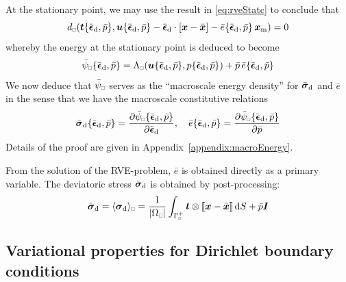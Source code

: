 \documentclass{bmcart}
\newcommand{\appref}[1]{Appendix~\ref{#1}}
\newcommand{\eqtref}[1]{\eqref{#1}}
\DeclarePairedDelimiter{\homgen}{\langle}{\rangle_\rve}
\DeclarePairedDelimiter{\jmp}{[\![}{]\!]}
\renewcommand{\dev}{\mathrm{d}}
\newcommand{\volume}{|\Omega_\rve|}
\newcommand{\epspargs}{\{{\bar{\ts\epsilon}}_\dev, \bar{p}\}}
\newcommand{\rve}{
  {\mathchoice
   {\mbox{\scalebox{0.67}{$\Box$}}}
   {\mbox{\scalebox{0.67}{$\Box$}}}
   {\mbox{\scalebox{0.5}{$\Box$}}}
   {\mbox{\scalebox{0.375}{$\Box$}}}
  }
}
\begin{document}
At the stationary point, we may use the result in \eqtref{eq:rveStatc} to conclude that
\begin{equation}
    d_\rve(\ta{t}\epspargs,\ta{u}\epspargs-\bar{\ts\epsilon}_\dev\cdot[\ta{x}-\bar{\ta{x}}]-\bar{e}\epspargs\,\ta{x}_\mean) = 0
\label{eq86}
\end{equation}
whereby the energy at the stationary point is deduced to become
\begin{equation}
    \bar{\psi}_\rve\epspargs =
    \Lambda_\rve(\ta{u}\epspargs,p\epspargs) + \bar{p}\,\bar{e}\epspargs
\label{eq87}
\end{equation}
We now deduce that $\bar{\psi}_\rve$ serves as the ``macroscale energy density'' for $\bar{\ts\sigma}_\dev$ and $\bar{e}$ in the sense that we have the macroscale constitutive relations
\begin{equation}
    \bar{\ts\sigma}_\dev\epspargs = \frac{\partial \bar{\psi}_\rve\epspargs}{\partial \bar{\ts\epsilon}_\dev}, \quad
     \bar{e}\epspargs = \frac{\partial \bar{\psi}_\rve\epspargs}{\partial \bar{p}}
\label{eq88}
\end{equation}
Details of the proof are given in \appref{appendix:macroEnergy}.

From the solution of the RVE-problem, $\bar{e}$ is obtained directly as a primary variable.
The deviatoric stress $\bar{\ts\sigma}_\dev$ is obtained by post-processing:
\begin{align}
 \bar{\ts\sigma}_\dev = \homgen{\ts\sigma_\dev} = \frac{1}{\volume} \int_{\Gamma_\rve^+} \ta t \outerp \jmp{\ta x - \bar{\ta x}}\dif S + \bar{p}\ts I
\label{eq:weak_periodic_sigma_dev}
\end{align}


\subsection{Variational properties for Dirichlet boundary conditions}
\end{document}
